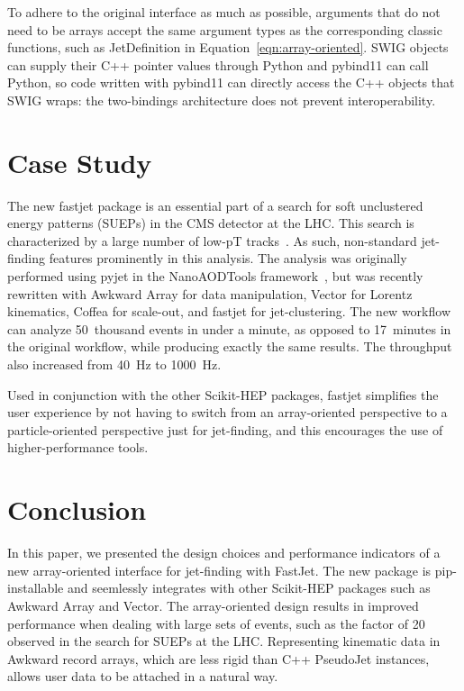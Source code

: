 \documentclass[a4paper]{jpconf}
\begin{document}
To adhere to the original interface as much as possible, arguments that do not need to be arrays accept the same argument types as the corresponding classic functions, such as JetDefinition in Equation~\ref{eqn:array-oriented}. SWIG objects can supply their C++ pointer values through Python and pybind11 can call Python, so code written with pybind11 can directly access the C++ objects that SWIG wraps: the two-bindings architecture does not prevent interoperability.

\section{Case Study}

The new fastjet package is an essential part of a search for soft unclustered energy patterns (SUEPs) in the CMS detector at the LHC. This search is characterized by a large number of low-pT tracks~\cite{Knapen:2016hky}. As such, non-standard jet-finding features prominently in this analysis. The analysis was originally performed using pyjet in the NanoAODTools framework~\cite{Rizzi:2019rsi}, but was recently rewritten with Awkward Array for data manipulation, Vector for Lorentz kinematics, Coffea for scale-out, and fastjet for jet-clustering. The new workflow can analyze 50~thousand events in under a minute, as opposed to 17~minutes in the original workflow, while producing exactly the same results. The throughput also increased from 40~Hz to 1000~Hz.

Used in conjunction with the other Scikit-HEP packages, fastjet simplifies the user experience by not having to switch from an array-oriented perspective to a particle-oriented perspective just for jet-finding, and this encourages the use of higher-performance tools.

\section{Conclusion}

In this paper, we presented the design choices and performance indicators of a new array-oriented interface for jet-finding with FastJet. The new package is pip-installable and seemlessly integrates with other Scikit-HEP packages such as Awkward Array and Vector. The array-oriented design results in improved performance when dealing with large sets of events, such as the factor of 20 observed in the search for SUEPs at the LHC. Representing kinematic data in Awkward record arrays, which are less rigid than C++ PseudoJet instances, allows user data to be attached in a natural way.
\end{document}
